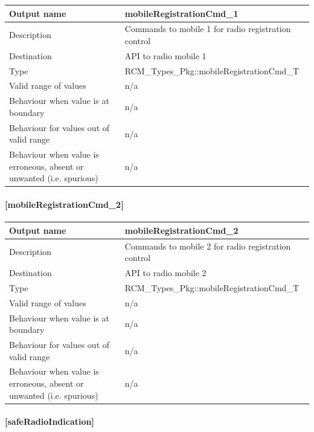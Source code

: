 \begin{longtable}{p{}p{}}
	\toprule
	Output name				& mobileRegistrationCmd\_1 \\
	\midrule
	Description				& Commands to mobile 1 for radio registration control  \\
	\midrule
	Destination				& API to radio mobile 1 \\ 
	\midrule
	Type					& RCM\_Types\_Pkg::mobileRegistrationCmd\_T \\
	\midrule
	Valid range of values	& n/a \\
	\midrule
	Behaviour when value is at boundary	& n/a \\
	\midrule
	Behaviour for values out of valid range	& n/a \\
	\midrule
	Behaviour when value is erroneous, absent or unwanted (i.e. spurious) & n/a \\
	\bottomrule
\end{longtable}

\paragraph{[mobileRegistrationCmd\_2]}

\begin{longtable}{p{}p{}}
	\toprule
	Output name				& mobileRegistrationCmd\_2 \\
	\midrule
	Description				& Commands to mobile 2 for radio registration control  \\
	\midrule
	Destination				& API to radio mobile 2 \\ 
	\midrule
	Type					& RCM\_Types\_Pkg::mobileRegistrationCmd\_T \\
	\midrule
	Valid range of values	& n/a \\
	\midrule
	Behaviour when value is at boundary	& n/a \\
	\midrule
	Behaviour for values out of valid range	& n/a \\
	\midrule
	Behaviour when value is erroneous, absent or unwanted (i.e. spurious) & n/a \\
	\bottomrule
\end{longtable}

\paragraph{[safeRadioIndication]}

